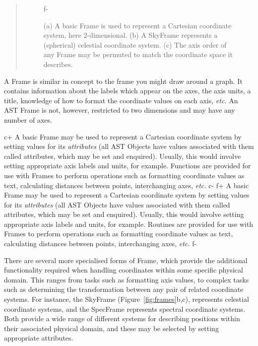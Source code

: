 \documentclass[twoside,11pt]{article}
\begin{document}
{\begin{htmlonly}
\begin{quote}
\begin{figure}
f-
   \caption{(a) A basic Frame is used to represent a Cartesian coordinate
   system, here 2-dimensional. (b) A SkyFrame represents a (spherical)
   celestial coordinate system. (c) The axis order of any Frame may be
   permuted to match the coordinate space it describes.}
   \end{figure}
   \end{quote}
\end{htmlonly}
A Frame is similar in concept to the frame you might draw around a
graph.  It contains information about the labels which appear on the
axes, the axis units, a title, knowledge of how to format the
coordinate values on each axis, {\em{etc.}}  An AST Frame is not,
however, restricted to two dimensions and may have any number of axes.

c+
A basic Frame may be used to represent a Cartesian coordinate system
by setting values for its {\em attributes} (all AST Objects have
values associated with them called attributes, which may be set and
enquired).  Usually, this would involve setting appropriate axis
labels and units, for example.  Functions are provided for use with
Frames to perform operations such as formatting coordinate values as
text, calculating distances between points, interchanging axes,
{\em{etc.}}
c-
f+
A basic Frame may be used to represent a Cartesian coordinate system
by setting values for its {\em attributes} (all AST Objects have
values associated with them called attributes, which may be set and
enquired).  Usually, this would involve setting appropriate axis
labels and units, for example.  Routines are provided for use with
Frames to perform operations such as formatting coordinate values as
text, calculating distances between points, interchanging axes,
{\em{etc.}}
f-

There are several more specialised forms of Frame, which provide the
additional functionality required when handling coordinates within some
specific physical domain. This ranges from tasks such as formatting axis
values, to complex tasks such as determining the transformation between
any pair of related coordinate systems. For instance, the SkyFrame
(Figure~\ref{fig:frames}b,c), represents celestial coordinate systems,
and the SpecFrame represents spectral coordinate systems. Both provide a
wide range of different systems for describing positions within their
associated physical domain, and these may be selected by setting appropriate 
attributes.  

}
\end{document}
